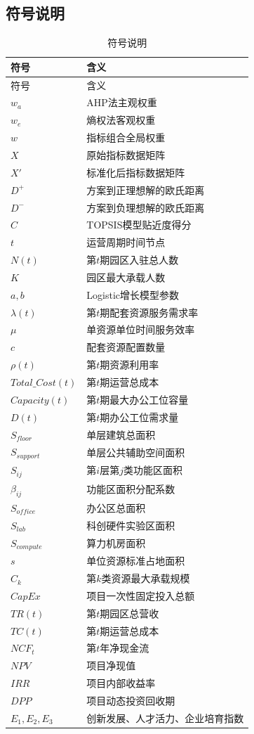 \documentclass[12pt,a4paper]{article}
\begin{document}
\subsection{符号说明}
\begin{longtable}{ll}
\caption{符号说明} \\
\hline
符号 & 含义 \\
\hline
\endfirsthead
\hline
符号 & 含义 \\
\hline
\endhead
\hline
\endfoot

$w_a$ & AHP法主观权重 \\
$w_e$ & 熵权法客观权重 \\
$w$ & 指标组合全局权重 \\
$X$ & 原始指标数据矩阵 \\
$X'$ & 标准化后指标数据矩阵 \\
$D^+$ & 方案到正理想解的欧氏距离 \\
$D^-$ & 方案到负理想解的欧氏距离 \\
$C$ & TOPSIS模型贴近度得分 \\
$t$ & 运营周期时间节点 \\
$N(t)$ & 第$t$期园区入驻总人数 \\
$K$ & 园区最大承载人数 \\
$a,b$ & Logistic增长模型参数 \\
$\lambda(t)$ & 第$t$期配套资源服务需求率 \\
$\mu$ & 单资源单位时间服务效率 \\
$c$ & 配套资源配置数量 \\
$\rho(t)$ & 第$t$期资源利用率 \\
$Total\_Cost(t)$ & 第$t$期运营总成本 \\
$Capacity(t)$ & 第$t$期最大办公工位容量 \\
$D(t)$ & 第$t$期办公工位需求量 \\
$S_{floor}$ & 单层建筑总面积 \\
$S_{support}$ & 单层公共辅助空间面积 \\
$S_{ij}$ & 第$i$层第$j$类功能区面积 \\
$\beta_{ij}$ & 功能区面积分配系数 \\
$S_{office}$ & 办公区总面积 \\
$S_{lab}$ & 科创硬件实验区面积 \\
$S_{compute}$ & 算力机房面积 \\
$s$ & 单位资源标准占地面积 \\
$C_k$ & 第$k$类资源最大承载规模 \\
$CapEx$ & 项目一次性固定投入总额 \\
$TR(t)$ & 第$t$期园区总营收 \\
$TC(t)$ & 第$t$期运营总成本 \\
$NCF_t$ & 第$t$年净现金流 \\
$NPV$ & 项目净现值 \\
$IRR$ & 项目内部收益率 \\
$DPP$ & 项目动态投资回收期 \\
$E_1,E_2,E_3$ & 创新发展、人才活力、企业培育指数 \\

\end{longtable}
\end{document}
